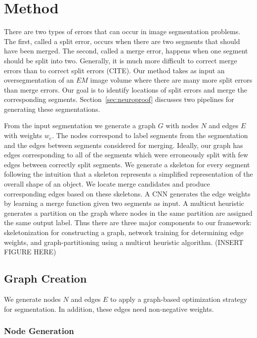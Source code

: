 \section{Method}

There are two types of errors that can occur in image segmentation problems.
The first, called a split error, occurs when there are two segments that should have been merged.
The second, called a merge error, happens when one segment should be split into two.
Generally, it is much more difficult to correct merge errors than to correct split errors (CITE). 
Our method takes as input an oversegmentation of an $EM$ image volume where there are many more split errors than merge errors.
Our goal is to identify locations of split errors and merge the corresponding segments.
Section~\ref{sec:neuroproof} discusses two pipelines for generating these segmentations.

From the input segmentation we generate a graph $G$ with nodes $N$ and edges $E$ with weights $w_e$. 
The nodes correspond to label segments from the segmentation and the edges between segments considered for merging.
Ideally, our graph has edges corresponding to all of the segments which were erroneously split with few edges between correctly split segments.
We generate a skeleton for every segment following the intuition that a skeleton represents a simplified representation of the overall shape of an object. 
We locate merge candidates and produce corresponding edges based on these skeletons.
A CNN generates the edge weights by learning a merge function given two segments as input. 
A multicut heuristic generates a partition on the graph where nodes in the same partition are assigned the same output label. 
Thus there are three major components to our framework: skeletonization for constructing a graph, network training for determining edge weights, and graph-partitioning using a multicut heuristic algorithm. (INSERT FIGURE HERE)

\subsection{Graph Creation}

We generate nodes $N$ and edges $E$ to apply a graph-based optimization strategy for segmentation. 
In addition, these edges need non-negative weights.

\subsubsection{Node Generation}


